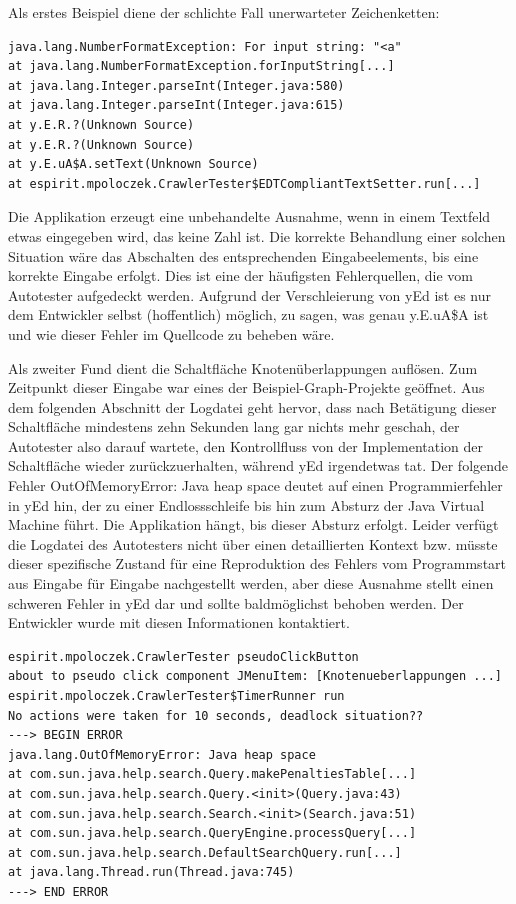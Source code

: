 Als erstes Beispiel diene der schlichte Fall unerwarteter Zeichenketten:

\begin{lstlisting}[float=!ht,label=fmjson,caption={Ausnahme yEd bei Eingabe einer Nicht-Zahl}]
java.lang.NumberFormatException: For input string: "<a"
at java.lang.NumberFormatException.forInputString[...]
at java.lang.Integer.parseInt(Integer.java:580)
at java.lang.Integer.parseInt(Integer.java:615)
at y.E.R.?(Unknown Source)
at y.E.R.?(Unknown Source)
at y.E.uA$A.setText(Unknown Source)
at espirit.mpoloczek.CrawlerTester$EDTCompliantTextSetter.run[...]
\end{lstlisting}

Die Applikation erzeugt eine unbehandelte Ausnahme, wenn in einem
Textfeld etwas eingegeben wird, das keine Zahl ist. Die korrekte Behandlung
einer solchen Situation wäre das Abschalten des entsprechenden Eingabeelements,
bis eine korrekte Eingabe erfolgt. Dies ist eine der häufigsten Fehlerquellen,
die vom Autotester aufgedeckt werden. Aufgrund der Verschleierung von
yEd ist es nur dem Entwickler selbst (hoffentlich) möglich, zu sagen,
was genau \glqq{}y.E.uA\$A\grqq{} ist und wie dieser Fehler im Quellcode
zu beheben wäre.

Als zweiter Fund dient die Schaltfläche \glqq{}Knotenüberlappungen auflösen\grqq{}.
Zum Zeitpunkt dieser Eingabe war eines der Beispiel-Graph-Projekte geöffnet.
Aus dem folgenden Abschnitt der Logdatei geht hervor, dass nach Betätigung
dieser Schaltfläche mindestens zehn Sekunden lang gar nichts mehr geschah,
der Autotester also darauf wartete, den Kontrollfluss von der Implementation der
Schaltfläche wieder zurückzuerhalten, während yEd irgendetwas tat. Der
folgende Fehler \glqq{}OutOfMemoryError: Java heap space\grqq{}
deutet auf einen Programmierfehler in yEd hin, der zu einer Endlossschleife
bis hin zum Absturz der Java Virtual Machine führt. Die Applikation \glqq{}hängt\grqq{}, bis
dieser Absturz erfolgt. Leider verfügt die Logdatei des Autotesters nicht über einen
detaillierten Kontext bzw. müsste dieser spezifische Zustand für eine
Reproduktion des Fehlers vom Programmstart aus Eingabe für Eingabe nachgestellt werden, 
aber diese Ausnahme stellt einen schweren Fehler in yEd
dar und sollte baldmöglichst behoben werden. Der Entwickler wurde
mit diesen Informationen kontaktiert.

\begin{lstlisting}[float=!ht,label=fmjson,caption={Ausnahme yEd durch Schaltfläche \glqq{}Knotenüberlappungen auflösen\grqq{}}]
espirit.mpoloczek.CrawlerTester pseudoClickButton
about to pseudo click component JMenuItem: [Knotenueberlappungen ...]
espirit.mpoloczek.CrawlerTester$TimerRunner run
No actions were taken for 10 seconds, deadlock situation??
---> BEGIN ERROR
java.lang.OutOfMemoryError: Java heap space
at com.sun.java.help.search.Query.makePenaltiesTable[...]
at com.sun.java.help.search.Query.<init>(Query.java:43)
at com.sun.java.help.search.Search.<init>(Search.java:51)
at com.sun.java.help.search.QueryEngine.processQuery[...]
at com.sun.java.help.search.DefaultSearchQuery.run[...]
at java.lang.Thread.run(Thread.java:745)
---> END ERROR
\end{lstlisting}


